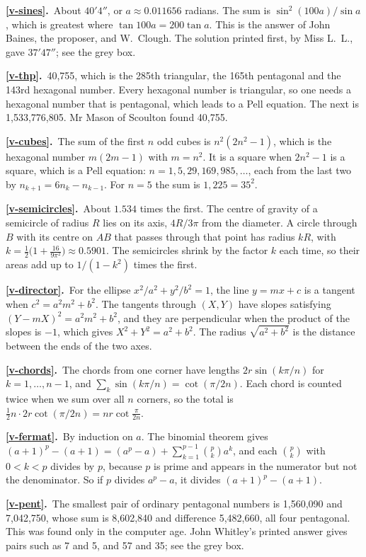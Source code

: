 \documentclass[11pt,a4paper]{article}
\newcommand{\ans}[2]{\par\smallskip\noindent\textbf{\ref{#1}.}\ #2}
\begin{document}
\ans{v-sines}{About $40'4''$, or $a \approx 0.011656$ radians. The sum is
$\sin^2(100a)/\sin a$, which is greatest where $\tan100a = 200\tan a$. This is the answer of
John Baines, the proposer, and W.~Clough. The solution printed first, by Miss L.~L., gave
$37'47''$; see the grey box.}

\ans{v-thp}{40,755, which is the 285th triangular, the 165th pentagonal and the 143rd
hexagonal number. Every hexagonal number is triangular, so one needs a hexagonal number
that is pentagonal, which leads to a Pell equation. The next is 1,533,776,805. Mr Mason of
Scoulton found 40,755.}

\ans{v-cubes}{The sum of the first $n$ odd cubes is $n^2(2n^2 - 1)$, which is the hexagonal
number $m(2m - 1)$ with $m = n^2$. It is a square when $2n^2 - 1$ is a square, which is
a Pell equation: $n = 1, 5, 29, 169, 985, \dots$, each from the last two by
$n_{k+1} = 6n_k - n_{k-1}$. For $n = 5$ the sum is $1{,}225 = 35^2$.}

\ans{v-semicircles}{About $1.534$ times the first. The centre of gravity of a semicircle of
radius $R$ lies on its axis, $4R/3\pi$ from the diameter. A circle through $B$ with its
centre on $AB$ that passes through that point has radius
$kR$, with $k = \tfrac12\bigl(1 + \tfrac{16}{9\pi^2}\bigr) \approx 0.5901$. The semicircles
shrink by the factor $k$ each time, so their areas add up to $1/(1 - k^2)$ times the first.}

\ans{v-director}{For the ellipse $x^2/a^2 + y^2/b^2 = 1$, the line $y = mx + c$ is a tangent
when $c^2 = a^2m^2 + b^2$. The tangents through $(X, Y)$ have slopes satisfying
$(Y - mX)^2 = a^2m^2 + b^2$, and they are perpendicular when the product of the slopes is
$-1$, which gives $X^2 + Y^2 = a^2 + b^2$. The radius $\sqrt{a^2+b^2}$ is the distance
between the ends of the two axes.}

\ans{v-chords}{The chords from one corner have lengths $2r\sin(k\pi/n)$ for
$k = 1, \dots, n-1$, and $\sum_k\sin(k\pi/n) = \cot(\pi/2n)$. Each chord is counted twice
when we sum over all $n$ corners, so the total is
$\tfrac12n\cdot2r\cot(\pi/2n) = nr\cot\frac\pi{2n}$.}

\ans{v-fermat}{By induction on $a$. The binomial theorem gives
$(a+1)^p - (a+1) = (a^p - a) + \sum_{k=1}^{p-1}\binom pk a^k$, and each $\binom pk$ with
$0 < k < p$ divides by $p$, because $p$ is prime and appears in the numerator but not the
denominator. So if $p$ divides $a^p - a$, it divides $(a+1)^p - (a+1)$.}

\ans{v-pent}{The smallest pair of ordinary pentagonal numbers is 1,560,090 and 7,042,750,
whose sum is 8,602,840 and difference 5,482,660, all four pentagonal. This was found only
in the computer age. John Whitley's printed answer gives pairs such as 7 and 5, and 57 and
35; see the grey box.}
\end{document}
